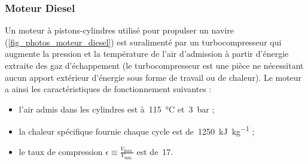 \subsubsection{Moteur Diesel}
\label{exo_cycle_moteur_diesel}

	Un moteur à pistons-cylindres utilisé pour propulser un navire (\cref{fig_photos_moteur_diesel}) est suralimenté par un turbocompresseur qui augmente la pression et la température de l’air d’admission à partir d’énergie extraite des gaz d’échappement (le turbocompresseur est une pièce ne nécessitant aucun apport extérieur d’énergie sous forme de travail ou de chaleur). Le moteur a ainsi les caractéristiques de fonctionnement suivantes :
	\begin{itemize}
		\item l’air admis dans les cylindres est à~\SI{115}{\degreeCelsius} et~\SI{3}{\bar} ;
		\item la chaleur spécifique fournie chaque cycle est de~\SI{1250}{\kilo\joule\per\kilogram} ;
		\item le taux de compression $\epsilon \equiv \frac{V_\text{max.}}{V_\text{min.}}$ est de~\num{17}.
	\end{itemize}
	

